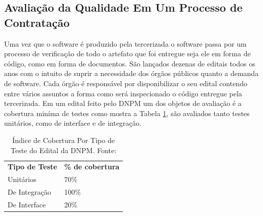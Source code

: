 \subsection{Avaliação da Qualidade Em Um Processo de Contratação }
Uma vez que o software é produzido pela tercerizada o software passa por um processo de verificação de todo o artefato que foi entregue seja ele em forma de código, como em forma de documentos. São lançados dezenas de editais todos os anos com o intuito de suprir a necessidade dos órgãos públicos quanto a demanda de software. Cada órgão é responsável por disponibilizar o seu edital contendo entre vários assuntos a forma como será inspecionado o código entregue pela tercerizada. Em um edital feito pelo DNPM \cite{edital} um dos objetos de avaliação é a cobertura miníma de testes como mostra a Tabela \ref{tabela1}, são avaliados tanto testes unitários, como de interface e de integração.

\begin{table}[h]
\centering
\caption{Índice de Cobertura Por Tipo de Teste do Edital da DNPM. Fonte:\cite{edital}}
\label{tabela1}
\begin{tabular}{ll}
\textbf{Tipo de Teste} & \textbf{\% de cobertura} \\
Unitários              & 70\%                     \\
De Integração          & 100\%                    \\
De Interface           & 20\%                    
\end{tabular}
\end{table}

